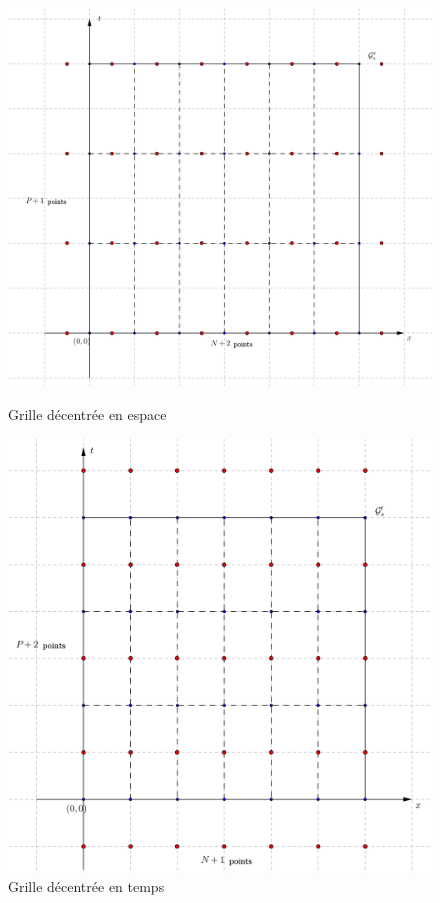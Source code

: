 \documentclass[a4paper,12pt]{article}
\begin{document}
\begin{figure}[!h]
\centering
\begin{minipage}{0.49\textwidth}
\centering
\includegraphics[width=0.9\linewidth]{img/grille_decentree_x.png}
\caption{Grille décentrée en espace}
\label{fig:staggeredX}
\end{minipage}
\hfill
\begin{minipage}{0.49\textwidth}
\centering
\includegraphics[width=0.9\linewidth]{img/grille_decentree_t.png}
\caption{Grille décentrée en temps}
\label{fig:staggeredT}
\end{minipage}
\end{figure}
\end{document}
